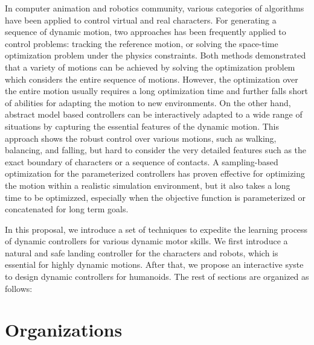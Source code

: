 In computer animation and robotics community, various categories
of algorithms have been applied to control virtual and real characters.
For generating a sequence of dynamic motion, two approaches has been
frequently applied to control problems: tracking the reference motion, or 
solving the space-time optimization problem under the physics constraints.
Both methods demonstrated that a variety of motions can be achieved 
by solving the optimization problem which considers the entire sequence
of motions.
However, the optimization over the entire motion usually requires
a long optimization time and further falls short of abilities
for adapting the motion to new environments.
On the other hand, abstract model based controllers can be interactively
adapted to a wide range of situations by capturing the essential features
of the dynamic motion.
This approach shows the robust control over various motions,
such as walking, balancing, and falling, but hard to consider the
very detailed features such as the exact boundary of characters 
or a sequence of contacts.
A sampling-based optimization for the parameterized controllers has proven
effective for optimizing the motion within a realistic simulation environment,
but it also takes a long time to be optimizzed, especially when the objective
function is parameterized or concatenated for long term goals.



In this proposal, we introduce a set of techniques to expedite
the learning process of dynamic controllers for various dynamic motor 
skills. We first introduce a natural and safe landing controller for
the characters and robots, which is essential for highly dynamic motions.
After that, we propose an interactive syste to design dynamic controllers
for humanoids. The rest of sections are organized as follows:


\section{Organizations}

